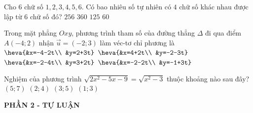 \begin{ex}%
Cho $6$ chữ số $1,2,3,4,5,6$. Có bao nhiêu số tự nhiên có $4$ chữ số khác nhau được lập từ $6$ chữ số đó? 
	\choice
	{$256$}
	{\True $360$}
	{$125$}
	{$60$}
\end{ex}

\begin{ex}%
Trong mặt phẳng $Oxy$, phương trình tham số của đường thẳng $\Delta$ đi qua điểm $A(-4 ; 2)$ nhận $\vec{u}=(-2 ; 3)$ làm véc-tơ chỉ phương là
	\choice
	{\True $\heva{&x=-4-2t\\ &y=2+3t}$}
	{$\heva{&x=4+2t\\ &y=-2-3t}$}
	{$\heva{&x=-2-4t\\ &y=3+2t}$}
	{$\heva{&x=-2-2t\\ &y=-1+3t}$}
\end{ex}

\begin{ex}%
Nghiệm của phương trình $\sqrt{2 x^2-5 x-9}=\sqrt{x^2-3}$ thuộc khoảng nào sau đây? 
	\choice
	{\True $(5 ; 7)$}
	{$(2 ; 4)$}
	{$(3 ; 5)$}
	{$(1 ; 3)$}
\end{ex}


\begin{center}
	\textbf{PHẦN 2 - TỰ LUẬN}
\end{center}

